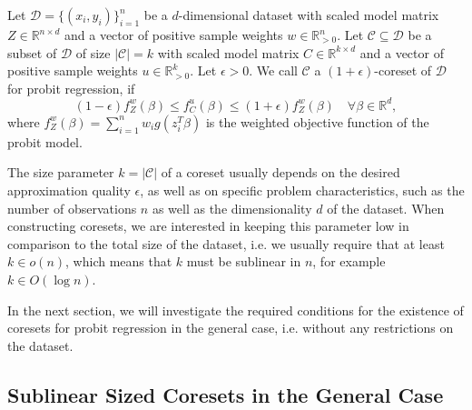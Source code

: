 \begin{definition}[Coreset]
    \label{def:coreset}
    Let $\mathcal{D}=\{(x_i, y_i)\}_{i=1}^n$ be a $d$-dimensional dataset
    with scaled model matrix $Z \in \mathbb{R}^{n \times d}$ and
    a vector of positive sample weights $w \in \mathbb{R}_{>0}^n$.
    Let $\mathcal{C} \subseteq \mathcal{D}$ be a subset of $\mathcal{D}$
    of size $|\mathcal{C}| = k$
    with scaled model matrix $C \in \mathbb{R}^{k \times d}$ and
    a vector of positive sample weights $u \in \mathbb{R}_{>0}^k$.
    Let $\epsilon > 0$.
    We call $\mathcal{C}$ a $(1+\epsilon)$-coreset of $\mathcal{D}$
    for probit regression, if
    \begin{equation*}
        (1-\epsilon)f_Z^w(\beta) \leq f_C^u(\beta) \leq (1+\epsilon)f_Z^w(\beta)
        \quad \forall \beta \in \mathbb{R}^d,
    \end{equation*}
    where $f_Z^w(\beta) = \sum_{i=1}^n w_i g(z_i^T \beta)$ is the
    weighted objective function of the probit model.
\end{definition}

The size parameter $k = |\mathcal{C}|$ of a coreset usually depends
on the desired approximation quality $\epsilon$, as well as on
specific problem characteristics, such as the number of observations
$n$ as well as the dimensionality $d$ of the dataset.
When constructing coresets, we are interested in keeping this parameter
low in comparison to the total size of the dataset, i.e. we
usually require that at least $k \in o(n)$, which means that $k$
must be sublinear in $n$, for example $k \in O(\log{n})$.

In the next section, we will investigate the required conditions for
the existence of coresets for probit regression in the general case,
i.e. without any restrictions on the dataset.

\subsection{Sublinear Sized Coresets in the General Case}

